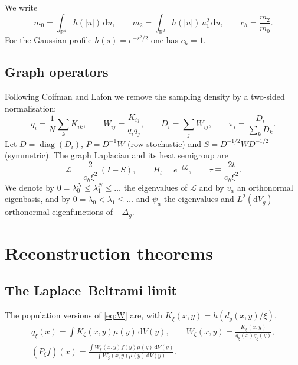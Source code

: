 \documentclass[11pt,a4paper]{article}
\theoremstyle{stmt}
\theoremstyle{defn}
\theoremstyle{rmk}
\numberwithin{equation}{section}
\newcommand{\Lc}{\mathcal{L}}
\newcommand{\R}{\mathbb{R}}
\newcommand{\dd}{\mathrm{d}}
\begin{document}
We write
\begin{equation}
m_0=\int_{\R^d}h(|u|)\,\dd u,\qquad m_2=\int_{\R^d}h(|u|)\,u_1^2\,\dd u,\qquad c_h=\frac{m_2}{m_0}.
\end{equation}
For the Gaussian profile $h(s)=e^{-s^2/2}$ one has $c_h=1$.

\subsection{Graph operators}

Following Coifman and Lafon \cite{CoifmanLafon} we remove the sampling density by a two-sided normalisation:
\begin{equation}\label{eq:W}
q_i=\frac1N\sum_k K_{ik},\qquad W_{ij}=\frac{K_{ij}}{q_iq_j},\qquad D_i=\sum_jW_{ij},\qquad \pi_i=\frac{D_i}{\sum_kD_k}.
\end{equation}
Let $D=\operatorname{diag}(D_i)$, $P=D^{-1}W$ (row-stochastic) and $S=D^{-1/2}WD^{-1/2}$ (symmetric). The graph Laplacian and its heat semigroup are
\begin{equation}\label{eq:L}
\Lc=\frac{2}{c_h\xi^2}\,(I-S),\qquad H_t=e^{-t\Lc},\qquad \tau\equiv\frac{2t}{c_h\xi^2}.
\end{equation}
We denote by $0=\lambda_0^{N}\le\lambda_1^{N}\le\dots$ the eigenvalues of $\Lc$ and by $v_a$ an orthonormal eigenbasis, and by $0=\lambda_0<\lambda_1\le\dots$ and $\psi_a$ the eigenvalues and $L^2(\dd V_g)$-orthonormal eigenfunctions of $-\Delta_g$.

\section{Reconstruction theorems}\label{sec:recon}

\subsection{The Laplace--Beltrami limit}

The population versions of \eqref{eq:W} are, with $K_\xi(x,y)=h(d_g(x,y)/\xi)$,
\begin{equation}
\begin{gathered}
q_\xi(x)=\int K_\xi(x,y)\mu(y)\,\dd V(y),\qquad
W_\xi(x,y)=\frac{K_\xi(x,y)}{q_\xi(x)q_\xi(y)},\\
(P_\xi f)(x)=\frac{\int W_\xi(x,y)f(y)\mu(y)\,\dd V(y)}{\int W_\xi(x,y)\mu(y)\,\dd V(y)} .
\end{gathered}
\end{equation}
\end{document}
